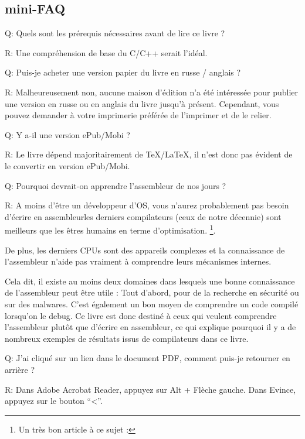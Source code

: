\subsection*{mini-FAQ}

\par Q: Quels sont les prérequis nécessaires avant de lire ce livre ?
\par R: Une compréhension de base du C/C++ serait l'idéal.

\par Q: Puis-je acheter une version papier du livre en russe / anglais ?
\par R: Malheureusement non, aucune maison d'édition n'a été intéressée pour publier une version en russe ou en anglais du livre jusqu'à présent.
Cependant, vous pouvez demander à votre imprimerie préférée de l'imprimer et de le relier.

\par Q: Y a-il une version ePub/Mobi ?
\par R: Le livre dépend majoritairement de TeX/LaTeX, il n'est donc pas évident de le convertir en version ePub/Mobi.

\par Q: Pourquoi devrait-on apprendre l'assembleur de nos jours ?
\par R: A moins d'être un développeur d'\ac{OS}, vous n'aurez probablement pas besoin d'écrire en assembleur\textemdash{}les derniers compilateurs (ceux de notre décennie) sont meilleurs que les êtres humains en terme d'optimisation. \footnote{Un très bon article à ce sujet : \InSqBrackets{\AgnerFog}}.

De plus, les derniers \ac{CPU}s sont des appareils complexes et la connaissance de l'assembleur n'aide pas vraiment à comprendre leurs mécanismes internes.

Cela dit, il existe au moins deux domaines dans lesquels une bonne connaissance de l'assembleur peut être utile : 
Tout d'abord, pour de la recherche en sécurité ou sur des malwares. C'est également un bon moyen de comprendre un code compilé lorsqu'on le debug.
Ce livre est donc destiné à ceux qui veulent comprendre l'assembleur plutôt que d'écrire en assembleur, ce qui explique pourquoi il y a de nombreux exemples de résultats issus de compilateurs dans ce livre. 

\par Q: J'ai cliqué sur un lien dans le document PDF, comment puis-je retourner en arrière ?
\par R: Dans Adobe Acrobat Reader, appuyez sur Alt + Flèche gauche. Dans Evince, appuyez sur le bouton ``<''.

